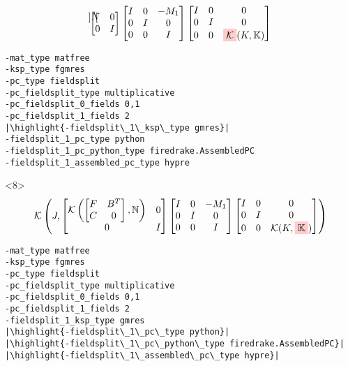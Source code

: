 \documentclass[presentation]{beamer}
\newcommand{\KSP}[2]{\ensuremath{\mathcal{K}\left(#1, \mathbb{#2}\right)}}
\newcommand{\highlight}[1]{\colorbox{red!20}{\color{black} #1}}
\begin{document}
\begin{frame}[fragile]
\begin{onlyenv}
\begin{equation*}
{\begin{bmatrix}
{\begin{bmatrix}
          \end{bmatrix}}{N} & 0\\
        0 & I
      \end{bmatrix}
      \begin{bmatrix}
        I & 0 & -M_1\\
        0 & I & 0 \\
        0 & 0 & I
      \end{bmatrix}
      \begin{bmatrix}
        I & 0 & 0\\
        0 & I & 0\\
        0 & 0 & \highlight{$\mathcal{K}$}(K, \mathbb{K})
      \end{bmatrix}}
    \end{equation*}
\begin{verbatim}
-mat_type matfree
-ksp_type fgmres
-pc_type fieldsplit
-pc_fieldsplit_type multiplicative
-pc_fieldsplit_0_fields 0,1
-pc_fieldsplit_1_fields 2
|\highlight{-fieldsplit\_1\_ksp\_type gmres}|
-fieldsplit_1_pc_type python
-fieldsplit_1_pc_python_type firedrake.AssembledPC
-fieldsplit_1_assembled_pc_type hypre
\end{verbatim}
  \end{onlyenv}
  \begin{onlyenv}<8>
    \color{gray}
    \begin{equation*}
      \KSP{J}{%
      \begin{bmatrix}
        \KSP{\begin{bmatrix}
            F & B^T\\
            C & 0
          \end{bmatrix}}{N} & 0\\
        0 & I
      \end{bmatrix}
      \begin{bmatrix}
        I & 0 & -M_1\\
        0 & I & 0 \\
        0 & 0 & I
      \end{bmatrix}
      \begin{bmatrix}
        I & 0 & 0\\
        0 & I & 0\\
        0 & 0 & \mathcal{K}(K, \highlight{$\mathbb{K}$})
      \end{bmatrix}}
    \end{equation*}
\begin{verbatim}
-mat_type matfree
-ksp_type fgmres
-pc_type fieldsplit
-pc_fieldsplit_type multiplicative
-pc_fieldsplit_0_fields 0,1
-pc_fieldsplit_1_fields 2
-fieldsplit_1_ksp_type gmres
|\highlight{-fieldsplit\_1\_pc\_type python}|
|\highlight{-fieldsplit\_1\_pc\_python\_type firedrake.AssembledPC}|
|\highlight{-fieldsplit\_1\_assembled\_pc\_type hypre}|
\end{verbatim}
  \end{onlyenv}
\end{frame}
\end{document}
